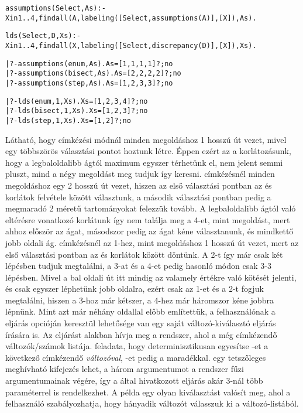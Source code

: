 \begin{alltt}
% a Select címkézési mód használatával megkeresi az X in 1..4 korlát összes
% megoldását, és a megoldásokhoz vezető utak hosszát As-ben adja vissza
assumptions(Select, As) :-
     X in 1..4, findall(A, labeling([Select, assumptions(A)], [X]), As).

% a Select címkézési mód és D eltérés-korlát használatával megkeresi az
% X in 1..4 korlát összes megoldását, és a megtalált megoldásokat visszaadja
% Xs-ben
lds(Select, D, Xs) :-
     X in 1..4, findall(X, labeling([Select, discrepancy(D)], [X]), Xs).

| ?- assumptions(enum, As).          As = [1,1,1,1] ? ; no
| ?- assumptions(bisect, As).        As = [2,2,2,2] ? ; no
| ?- assumptions(step, As).          As = [1,2,3,3] ? ; no

| ?- lds(enum, 1, Xs).               Xs = [1,2,3,4] ? ; no
| ?- lds(bisect, 1, Xs).             Xs = [1,2,3] ? ; no
| ?- lds(step, 1, Xs).               Xs = [1,2] ? ; no
\end{alltt}

Látható, hogy  címkézési módnál minden megoldáshoz 1 hosszú út vezet,
mivel egy többszörös választási pontot hoztunk létre. Éppen ezért az a korlátozásunk,
hogy a legbaloldalibb ágtól maximum egyszer térhetünk el, nem jelent semmi pluszt,
mind a négy megoldást meg tudjuk így keresni.
\br
{} címkézésnél minden megoldáshoz egy 2 hosszú út vezet, hiszen az
első választási pontban az  és  korlátok felvétele között
választunk, a második választási pontban pedig a megmaradó 2 méretű tartományokat
felezzük tovább. A legbaloldalibb ágtól való eltérésre vonatkozó korlátunk így nem
találja meg a 4-et, mint megoldást, mert ahhoz először az  ágat, másodszor
pedig az  ágat kéne választanunk, és mindkettő jobb oldali ág.
\br
{} címkézésnél az 1-hez, mint megoldáshoz 1 hosszú út vezet, mert az első
választási pontban az  és  korlátok között döntünk. A 2-t így
már csak két lépésben tudjuk megtalálni, a 3-at és a 4-et pedig hasonló módon csak
3-3 lépésben. Mivel a bal oldali út itt mindig az  valamely értékre való kötését
jelenti, és csak egyszer léphetünk jobb oldalra, ezért csak az 1-et és a 2-t fogjuk
megtalálni, hiszen a 3-hoz már kétszer, a 4-hez már háromszor kéne jobbra lépnünk.
\br
\label{variable:sel}
Mint azt már néhány oldallal előbb említettük, a felhasználónak a 
eljárás  opcióján keresztül lehetősége van egy saját változó-kiválasztó
eljárás írására is. Az eljárást  alakban hívja meg a rendszer,
ahol  a még címkézendő változók/számok listája.  feladata, hogy
determinisztikusan egyesítse -et a következő címkézendő \emph{változóval},
-et pedig a maradékkal.  egy tetszőleges meghívható kifejezés lehet,
a három argumentumot a rendszer fűzi  argumentumainak végére, így a 
által hivatkozott eljárás akár 3-nál több paraméterrel is rendelkezhet. A példa egy olyan
kiválasztást valósít meg, ahol a felhasználó szabályozhatja, hogy hányadik változót
válasszuk ki a változó-listából.

